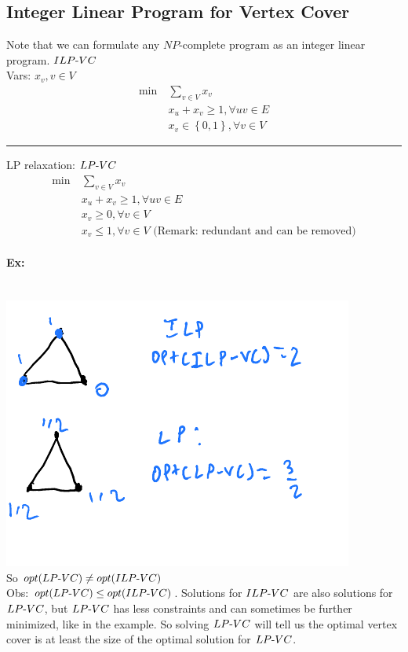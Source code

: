 \documentclass[12 pt]{article}
\begin{document}
          \subsection{Integer Linear Program for Vertex Cover}
          Note that we can formulate any $NP$-complete program as an
          integer linear program. 
          $ILP\hbox{-}VC$
          \\ Vars: $x_v, v \in V$
          \begin{align*}
            \min \ &\sum_{v\in V} x_v
            \\ & x_u + x_v \geq 1, \forall uv \in E
            \\ & x_v \in \left\{0,1\right\}, \forall v \in V
          \end{align*}
          \noindent \rule{\textwidth}{0.5pt}
          LP relaxation: $LP\hbox{-}VC$
          \begin{align*}
            \min \ & \sum_{v\in V}x_v
            \\ & x_u+x_v \geq 1, \forall uv \in E
            \\ & x_v \geq 0, \forall v \in V
            \\ & x_v \leq 1, \forall v \in V \text{ (Remark: redundant
                 and can be removed)}
          \end{align*}
          \paragraph{Ex:}~
          \\ \includegraphics[width=.9\textwidth]{i148.pdf}
          \\ So $opt(LP\hbox{-}VC)\neq opt(ILP\hbox{-}VC)$
          \\ Obs: $opt(LP\hbox{-}VC)\leq
          opt(ILP\hbox{-}VC)$. Solutions for $ILP\hbox{-}VC$ are also
          solutions for $LP\hbox{-}VC$, but $LP\hbox{-}VC$ has less
          constraints and can sometimes be further minimized, like in
          the example. So solving $LP\hbox{-}VC$ will tell us the
          optimal vertex cover is at least the size of the optimal
          solution for $LP\hbox{-}VC$.
\end{document}
